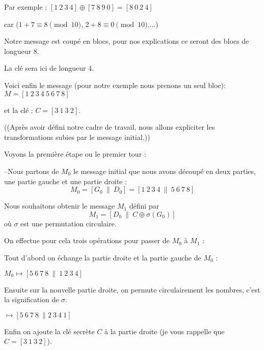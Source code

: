 \change

Par exemple :
$[1 \ 2 \ 3 \  4] \oplus [7\  8\  9\  0] = [8\  0\  2\  4]$ 

car ($1+7 \equiv 8 \pmod{10}$,
$2+8\equiv 0 \pmod{10}$,...)

\change

Notre message est coupé en blocs, pour nos explications 
ce seront des blocs de longueur $8$. 

\change

La clé sera ici de longueur $4$.

\change

Voici enfin le message (pour notre exemple nous prenons un seul bloc): 
$M = [1\  2\  3\  4\  5\  6\  7\  8]$ 

\change

et la clé : $C=[3\  1\  3\  2]$.

\diapo

((Après avoir défini notre cadre de travail, nous allons expliciter les transformations 
subies par le message initial.))

Voyons la première étape ou le premier tour : 

--Nous partons de $M_0$ le message initial que nous avons découpé en deux parties, 
une partie gauche et une partie droite :
$$M_0 = [ G_0 \ \|\  D_0] = [1\  2\  3\  4\  \| \ 5\  6\  7\  8]$$

\change 

Nous souhaitons obtenir le message $M_1$ défini par
$$M_1 = [ D_0 \ \|\  C \oplus \sigma(G_0)]$$
où $\sigma$ est une permutation circulaire.


On effectue pour cela trois opérations pour passer de $M_0$ à $M_1$ :


\change

Tout d'abord on échange la partie droite et la partie gauche de $M_0$ :
  
\change  

$M_0  \longmapsto  [5\  6\  7\  8\  \|\  1\  2\  3\  4]$


\change

Ensuite sur la nouvelle partie droite, on permute circulairement les nombres, c'est la signification de $\sigma$.
  
\change  

$\longmapsto  [5\  6\  7\  8\  \| 2\  3\  4\  1]$

\change 

Enfin on ajoute la clé secrète $C$ à la partie droite (je vous rappelle que 
$C=[3\  1\  3\  2]$).

